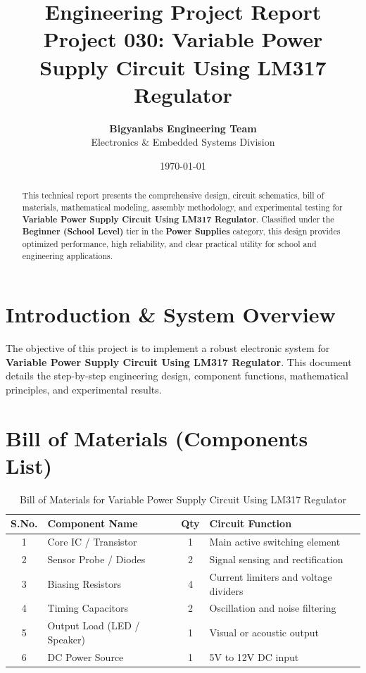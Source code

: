 \documentclass[11pt,a4paper]{article}
\title{\textbf{\Huge Engineering Project Report}\\[0.5em] \Large Project 030: Variable Power Supply Circuit Using LM317 Regulator}
\author{\textbf{Bigyanlabs Engineering Team}\\ Electronics \& Embedded Systems Division}
\date{\today}
\begin{document}
\maketitle
\thispagestyle{empty}

\begin{abstract}
This technical report presents the comprehensive design, circuit schematics, bill of materials, mathematical modeling, assembly methodology, and experimental testing for \textbf{Variable Power Supply Circuit Using LM317 Regulator}. Classified under the \textbf{Beginner (School Level)} tier in the \textbf{Power Supplies} category, this design provides optimized performance, high reliability, and clear practical utility for school and engineering applications.
\end{abstract}

\newpage
\tableofcontents
\newpage

\section{Introduction \& System Overview}
The objective of this project is to implement a robust electronic system for \textbf{Variable Power Supply Circuit Using LM317 Regulator}. This document details the step-by-step engineering design, component functions, mathematical principles, and experimental results.

\section{Bill of Materials (Components List)}
\begin{table}[h!]
\centering
\caption{Bill of Materials for Variable Power Supply Circuit Using LM317 Regulator}
\vspace{0.5em}
\begin{tabular}{clcp{7cm}}
\toprule
\textbf{S.No.} & \textbf{Component Name} & \textbf{Qty} & \textbf{Circuit Function} \\
\midrule
1 & Core IC / Transistor & 1 & Main active switching element \\
2 & Sensor Probe / Diodes & 2 & Signal sensing and rectification \\
3 & Biasing Resistors & 4 & Current limiters and voltage dividers \\
4 & Timing Capacitors & 2 & Oscillation and noise filtering \\
5 & Output Load (LED / Speaker) & 1 & Visual or acoustic output \\
6 & DC Power Source & 1 & 5V to 12V DC input \\
\bottomrule
\end{tabular}
\end{table}
\end{document}
